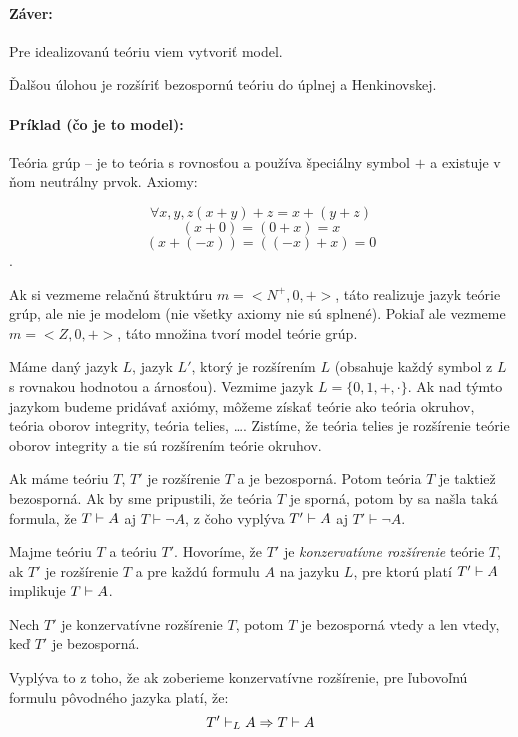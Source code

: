 \paragraph{Záver:} Pre idealizovanú teóriu viem vytvoriť model.

\par Ďalšou úlohou je rozšíriť bezospornú teóriu do úplnej a Henkinovskej.

\paragraph{Príklad (čo je to model):} Teória grúp -- je to teória s rovnosťou a
používa špeciálny symbol $+$ a existuje v ňom neutrálny prvok. Axiomy:

$$\forall x,y,z (x+y)+z = x+(y+z)$$
$$(x+0) = (0+x) = x$$
$$(x+(-x)) = ((-x)+x) = 0$$.

\par Ak si vezmeme relačnú štruktúru $m=<N^+,0,+>$, táto realizuje jazyk teórie
grúp, ale nie je modelom (nie všetky axiomy nie sú splnené). Pokiaľ ale vezmeme
$m=<Z,0,+>$, táto množina tvorí model teórie grúp.  

\par Máme daný jazyk $L$, jazyk $L'$, ktorý je rozšírením $L$ (obsahuje každý
symbol z $L$ s rovnakou hodnotou a árnosťou). Vezmime jazyk $L= \{0, 1, +,
\cdot \}$. Ak nad týmto jazykom budeme pridávať axiómy, môžeme získať teórie ako
teória okruhov, teória oborov integrity, teória telies, \ldots . Zistíme, že
teória telies je rozšírenie teórie oborov integrity a tie sú rozšírením teórie
okruhov. 

\par Ak máme teóriu $T$, $T'$ je rozšírenie $T$ a je bezosporná. Potom teória
$T$ je taktiež bezosporná. Ak by sme pripustili, že teória $T$ je sporná, potom
by sa našla taká formula, že $T \vdash A$ aj $T \vdash \neg A$, z čoho vyplýva
$T' \vdash A$ aj $T' \vdash \neg A$.

\begin{definicia}
    Majme teóriu $T$ a teóriu $T'$. Hovoríme, že $T'$ je
    \emph{konzervatívne rozšírenie} teórie $T$,
    ak $T'$ je rozšírenie $T$ a pre každú formulu $A$ na jazyku $L$,
    pre ktorú platí $T' \vdash A$ implikuje $T \vdash A$.
\end{definicia}    

\begin{lema} 
    Nech $T'$ je konzervatívne rozšírenie $T$, potom $T$ je
    bezosporná vtedy a len vtedy, keď $T'$ je bezosporná.
\end{lema}
\begin{dokaz}
    Vyplýva to z toho, že ak zoberieme konzervatívne rozšírenie,
    pre ľubovoľnú formulu pôvodného jazyka platí, že:
    \begin{equation*}
        T' \vdash_L A \Rightarrow T \vdash A
    \end{equation*}
\end{dokaz}    

